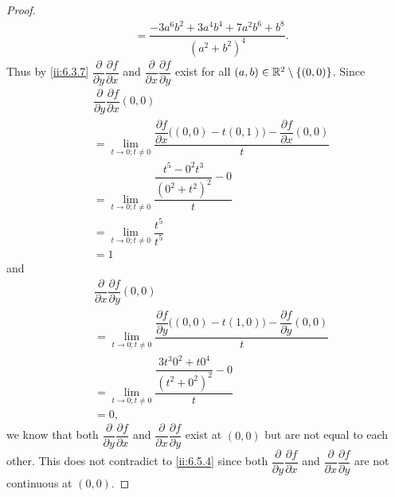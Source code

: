 \begin{proof}
\begin{align*}
     & = \dfrac{-3 a^6 b^2 + 3 a^4 b^4 + 7 a^2 b^6 + b^8}{(a^2 + b^2)^4}.
  \end{align*}
  Thus by \cref{ii:6.3.7} \(\dfrac{\partial}{\partial y} \dfrac{\partial f}{\partial x}\) and \(\dfrac{\partial}{\partial x} \dfrac{\partial f}{\partial y}\) exist for all \((a, b) \in \mathbb{R}^2 \setminus \left\lbrace(0, 0)\right\rbrace\).
  Since
  \begin{align*}
     & \dfrac{\partial}{\partial y} \dfrac{\partial f}{\partial x}(0, 0)                                                                      \\
     & = \lim_{t \to 0 ; t \neq 0} \dfrac{\dfrac{\partial f}{\partial x}\big((0, 0) - t(0, 1)\big) - \dfrac{\partial f}{\partial x}(0, 0)}{t} \\
     & = \lim_{t \to 0 ; t \neq 0} \dfrac{\dfrac{t^5 - 0^2 t^3}{(0^2 + t^2)^2} - 0}{t}                                                        \\
     & = \lim_{t \to 0 ; t \neq 0} \dfrac{t^5}{t^5}                                                                                           \\
     & = 1
  \end{align*}
  and
  \begin{align*}
     & \dfrac{\partial}{\partial x} \dfrac{\partial f}{\partial y}(0, 0)                                                                      \\
     & = \lim_{t \to 0 ; t \neq 0} \dfrac{\dfrac{\partial f}{\partial y}\big((0, 0) - t(1, 0)\big) - \dfrac{\partial f}{\partial y}(0, 0)}{t} \\
     & = \lim_{t \to 0 ; t \neq 0} \dfrac{\dfrac{3 t^3 0^2 + t 0^4}{(t^2 + 0^2)^2} - 0}{t}                                                    \\
     & = 0,
  \end{align*}
  we know that both \(\dfrac{\partial}{\partial y} \dfrac{\partial f}{\partial x}\) and \(\dfrac{\partial}{\partial x} \dfrac{\partial f}{\partial y}\) exist at \((0, 0)\) but are not equal to each other.
  This does not contradict to \cref{ii:6.5.4} since both \(\dfrac{\partial}{\partial y} \dfrac{\partial f}{\partial x}\) and \(\dfrac{\partial}{\partial x} \dfrac{\partial f}{\partial y}\) are not continuous at \((0, 0)\).
\end{proof}
